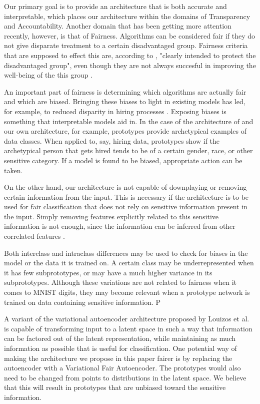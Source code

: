 Our primary goal is to provide an architecture that is both accurate and interpretable, which places our architecture within the domains of Transparency and Accountability. Another domain that has been getting more attention recently, however, is that of Fairness. Algorithms can be considered fair if they do not give disparate treatment to a certain disadvantaged group. Fairness criteria that are supposed to effect this are, according to \citet{fairnessgeneral}, "clearly intended to protect the disadvantaged group", even though they are not always succesful in improving the well-being of the this group \citep{fairnessgeneral}.

An important part of fairness is determining which algorithms are actually fair and which are biased. Bringing these biases to light in existing models has led, for example, to reduced disparity in hiring processes \citep{accountabilitycompanies}. Exposing biases is something that interpretable models aid in. In the case of the architecture of \citet{li2018deep} and our own architecture, for example, prototypes provide archetypical examples of data classes. When applied to, say, hiring data, prototypes show if the archetypical person that gets hired tends to be of a certain gender, race, or other sensitive category. If a model is found to be biased, appropriate action can be taken.

On the other hand, our architecture is not capable of downplaying or removing certain information from the input. This is necessary if the architecture is to be used for fair classification that does not rely on sensitive information present in the input. Simply removing features explicitly related to this sensitive information is not enough, since the information can be inferred from other correlated features \citep{unawarenesssucks}.

Both interclass and intraclass differences may be used to check for biases in the model or the data it is trained on. A certain class may be underrepresented when it has few subprototypes, or may have a much higher variance in its subprototypes. Although these variations are not related to fairness when it comes to MNIST digits, they may become relevant when a prototype network is trained on data containing sensitive information. P

A variant of the variational autoencoder architecture \citep{vae} proposed by Louizos et al. \citep{vfae} is capable of transforming input to a latent space in such a way that information can be factored out of the latent representation, while maintaining as much information as possible that is useful for classification. One potential way of making the architecture we propose in this paper fairer is by replacing the autoencoder with a Variational Fair Autoencoder. The prototypes would also need to be changed from points to distributions in the latent space. We believe that this will result in prototypes that are unbiased toward the sensitive information.

